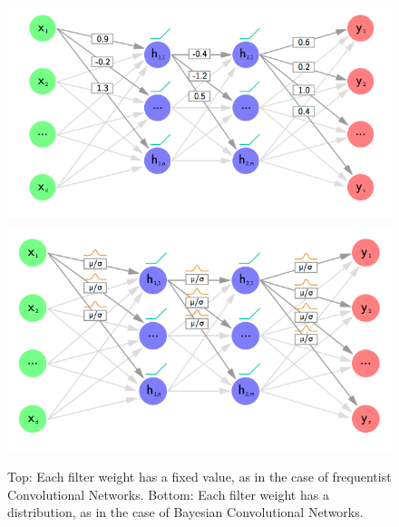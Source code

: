 \begin{figure}[H]
\begin{center}
\includegraphics[height=.28\textheight]{Chapter1/Figs/weights.png}
\includegraphics[height=.28\textheight]{Chapter1/Figs/distribution.png}
\label{fig:Scalar_Bayesian_Distribution_Gluon}
\caption{Top: Each filter weight has a fixed value, as in the case of frequentist Convolutional Networks. Bottom: Each filter weight has a distribution, as in the case of Bayesian Convolutional Networks. \cite{Gluon}}
\end{center}
\end{figure}


